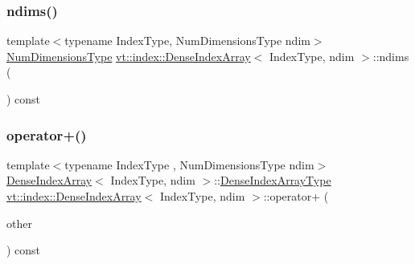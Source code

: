 \mbox{\label{structvt_1_1index_1_1_dense_index_array_acdd28d6484fd548fdd18609b2c7ff4fe}} 
\subsubsection{\texorpdfstring{ndims()}{ndims()}}
{\footnotesize\ttfamily template$<$typename Index\+Type, Num\+Dimensions\+Type ndim$>$ \\
\hyperlink{namespacevt_1_1index_a97aa9370711425850c86bcb7a20d73e8}{Num\+Dimensions\+Type} \hyperlink{structvt_1_1index_1_1_dense_index_array}{vt\+::index\+::\+Dense\+Index\+Array}$<$ Index\+Type, ndim $>$\+::ndims (\begin{DoxyParamCaption}{ }\end{DoxyParamCaption}) const\hspace{0.3cm}{\ttfamily [inline]}}

\mbox{\label{structvt_1_1index_1_1_dense_index_array_a2f63f2603e58cf017c07f11f9e233409}} 
\subsubsection{\texorpdfstring{operator+()}{operator+()}}
{\footnotesize\ttfamily template$<$typename Index\+Type , Num\+Dimensions\+Type ndim$>$ \\
\hyperlink{structvt_1_1index_1_1_dense_index_array}{Dense\+Index\+Array}$<$ Index\+Type, ndim $>$\+::\hyperlink{structvt_1_1index_1_1_dense_index_array_aec95c4ed1b4071d31d24142f02429dbd}{Dense\+Index\+Array\+Type} \hyperlink{structvt_1_1index_1_1_dense_index_array}{vt\+::index\+::\+Dense\+Index\+Array}$<$ Index\+Type, ndim $>$\+::operator+ (\begin{DoxyParamCaption}\item[{\hyperlink{structvt_1_1index_1_1_dense_index_array_aec95c4ed1b4071d31d24142f02429dbd}{Dense\+Index\+Array\+Type} const \&}]{other }\end{DoxyParamCaption}) const}

